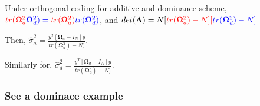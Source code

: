 \documentclass[]{article}
\begin{document}
Under orthogonal coding for additive and dominance scheme,
\(\color{red}{tr(\mathbf{\Omega}^2_a}\color{blue}{\mathbf{\Omega}^2_d)}=\color{red}{tr(\mathbf{\Omega}^2_a)}\color{blue}{tr{(\mathbf{\Omega}^2_d)}}\),
and
\(det(\mathbf {\Lambda})=N[\color{red}{tr(\mathbf{\Omega}^2_a)}-N][\color{blue}{tr(\mathbf{\Omega}^2_d)}-N]\)

Then,
\(\hat{\sigma}^2_a=\frac{y^T[\mathbf{\Omega}_a-I_N]y}{tr(\mathbf{\Omega}^2_a)-N)}\).

Similarly for,
\(\hat{\sigma}^2_d=\frac{y^T[\mathbf{\Omega}_d-I_N]y}{tr(\mathbf{\Omega}^2_d)-N)}\).

\hypertarget{see-a-dominace-example}{%
\subsubsection{See a dominace example}\label{see-a-dominace-example}}
\end{document}
